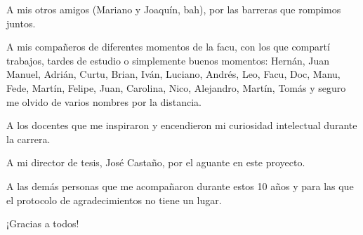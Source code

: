 \medskip

\noindent A mis otros amigos (Mariano y Joaquín, bah), por las barreras que rompimos juntos. \newline

\medskip

\noindent A mis compañeros de diferentes momentos de la facu, con los que compartí trabajos, tardes de estudio o simplemente buenos momentos: Hernán, Juan Manuel, Adrián, Curtu, Brian, Iván, Luciano, Andrés, Leo, Facu, Doc, Manu, Fede, Martín, Felipe, Juan, Carolina, Nico, Alejandro, Martín, Tomás y seguro me olvido de varios nombres por la distancia. \newline

\noindent A los docentes que me inspiraron y encendieron mi curiosidad intelectual durante la carrera. \newline

\medskip

\noindent A mi director de tesis, José Castaño, por el aguante en este proyecto. \newline

\medskip


\noindent A las demás personas que me acompañaron durante estos 10 años y para las que el protocolo de agradecimientos no tiene un lugar. \newline

\begin{centering}
	¡Gracias a todos!
\end{centering}